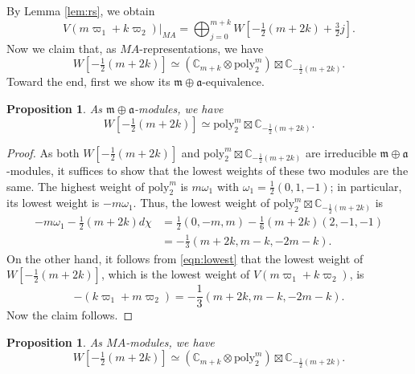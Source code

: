 \documentclass[reqno,11pt]{amsart}
\newtheorem{prop}[equation]{Proposition}
\theoremstyle{remark}
\numberwithin{equation}{section}
\newcommand{\f}{\mathfrak}
\newcommand{\C}{\mathbb{C}}
\newcommand{\poly}{\mathrm{poly}}
\begin{document}
By Lemma \ref{lem:rs}, we obtain
\begin{equation}\label{eqn:decomp}
V(m\varpi_1 + k \varpi_2)\vert_{MA}
=\bigoplus_{j=0}^{m+k}W[-\tfrac{1}{2}(m+2k)+\tfrac{3}{2}j].
\end{equation}
Now we claim that, as $MA$-representations, we have 
\begin{equation*}
W[-\tfrac{1}{2}(m+2k)] \simeq 
(\C_{m+k} \otimes \poly^{m}_2) \boxtimes \C_{-\tfrac{1}{2}(m+2k)}.
\end{equation*}
Toward the end, first we show its $\f{m}\oplus\f{a}$-equivalence.

\begin{prop}\label{prop:ma}
As $\f{m}\oplus\f{a}$-modules, we have 
\begin{equation*}
W[-\tfrac{1}{2}(m+2k)] \simeq 
\poly^{m}_2 \boxtimes \C_{-\tfrac{1}{2}(m+2k)}.
\end{equation*}
\end{prop}

\begin{proof}
As both $W[-\tfrac{1}{2}(m+2k)]$ and $\poly^{m}_2 \boxtimes \C_{-\tfrac{1}{2}(m+2k)}$
are irreducible $\f{m}\oplus\f{a}$-modules, it suffices to show that the lowest weights
of these two modules are the same.
The highest weight of $\poly^{m}_2$ is
$m\omega_1$ with $\omega_1=\frac{1}{2}(0, 1, -1)$; in particular, its lowest weight is
$-m\omega_1$. Thus, the lowest weight of $\poly^{m}_2\boxtimes  \C_{-\tfrac{1}{2}(m+2k)}$ 
is
\begin{align*}
-m\omega_1 -\tfrac{1}{2}(m+2k)d\chi
&=\frac{1}{2}(0, -m, m) - \frac{1}{6}(m+2k)(2,-1,-1)\\
&=-\frac{1}{3}(m+2k, m-k, -2m-k).
\end{align*}
On the other hand, it follows from \eqref{eqn:lowest} that the lowest weight of 
$W[-\tfrac{1}{2}(m+2k)]$, which is the lowest weight of $V(m\varpi_1 +k\varpi_2)$,
is
\begin{equation*}
 -(k\varpi_1+m\varpi_2)=
 -\frac{1}{3}(m+2k, m-k, -2m-k). 
\end{equation*}
Now the claim follows.
\end{proof}



\begin{prop}\label{prop:MA}
As $MA$-modules, we have 
\begin{equation}\label{eqn:wp}
W[-\tfrac{1}{2}(m+2k)] \simeq 
(\C_{m+k} \otimes \poly^{m}_2) \boxtimes \C_{-\tfrac{1}{2}(m+2k)}.
\end{equation}
\end{prop}
\end{document}
